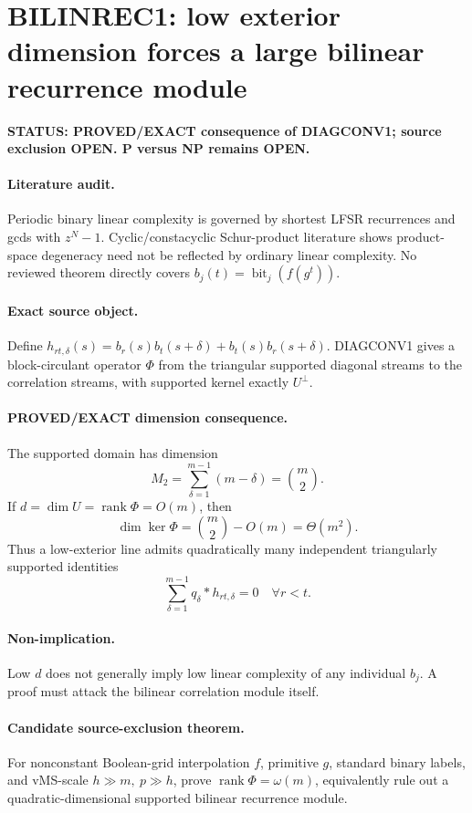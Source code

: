 \documentclass[11pt]{article}\usepackage[margin=.88in]{geometry}\usepackage{amsmath,amssymb}
\begin{document}
\section*{BILINREC1: low exterior dimension forces a large bilinear recurrence module}
\textbf{STATUS: PROVED/EXACT consequence of DIAGCONV1; source exclusion OPEN. P versus NP remains OPEN.}
\paragraph{Literature audit.} Periodic binary linear complexity is governed by shortest LFSR recurrences and gcds with \(z^N-1\). Cyclic/constacyclic Schur-product literature shows product-space degeneracy need not be reflected by ordinary linear complexity. No reviewed theorem directly covers \(b_j(t)=\operatorname{bit}_j(f(g^t))\).
\paragraph{Exact source object.} Define \(h_{rt,\delta}(s)=b_r(s)b_t(s+\delta)+b_t(s)b_r(s+\delta)\). DIAGCONV1 gives a block-circulant operator \(\Phi\) from the triangular supported diagonal streams to the correlation streams, with supported kernel exactly \(U^\perp\).
\paragraph{PROVED/EXACT dimension consequence.} The supported domain has dimension
\[
M_2=\sum_{\delta=1}^{m-1}(m-\delta)=\binom m2.
\]
If \(d=\dim U=\operatorname{rank}\Phi=O(m)\), then
\[
\boxed{\dim\ker\Phi=\binom m2-O(m)=\Theta(m^2).}
\]
Thus a low-exterior line admits quadratically many independent triangularly supported identities
\[
\sum_{\delta=1}^{m-1}q_\delta*h_{rt,\delta}=0
\quad\forall r<t.
\]
\paragraph{Non-implication.} Low \(d\) does not generally imply low linear complexity of any individual \(b_j\). A proof must attack the bilinear correlation module itself.
\paragraph{Candidate source-exclusion theorem.} For nonconstant Boolean-grid interpolation \(f\), primitive \(g\), standard binary labels, and vMS-scale \(h\gg m,\ p\gg h\), prove \(\operatorname{rank}\Phi=\omega(m)\), equivalently rule out a quadratic-dimensional supported bilinear recurrence module.
\end{document}
